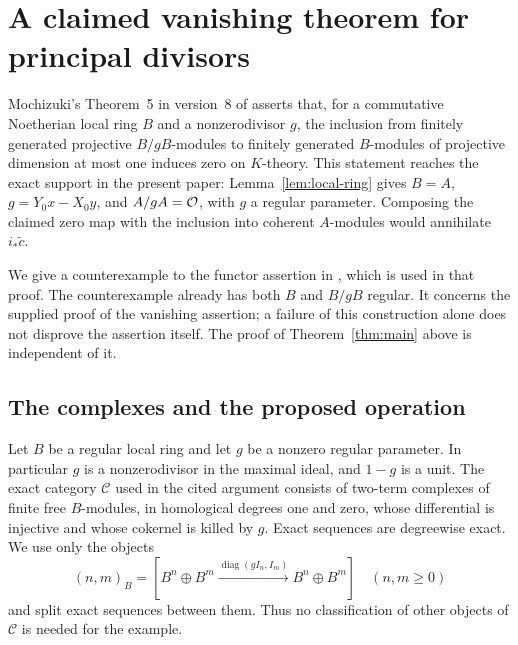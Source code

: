 \section{A claimed vanishing theorem for principal divisors}
\label{app:claimed-vanishing}

Mochizuki's Theorem~5 in version~8 of
\cite{Mochizuki2020} asserts that, for a commutative Noetherian local
ring $B$ and a nonzerodivisor $g$, the inclusion from finitely generated
projective $B/gB$-modules to finitely generated $B$-modules of projective
dimension at most one induces zero on $K$-theory. This statement reaches
the exact support in the present paper: Lemma~\ref{lem:local-ring} gives
$B=A$, $g=Y_0x-X_0y$, and $A/gA=\mathcal O$, with $g$ a regular parameter.
Composing the claimed zero map with the inclusion into coherent
$A$-modules would annihilate $i_*\widetilde c$.

We give a counterexample to the functor assertion in
\cite[Lemma~13(III)]{Mochizuki2020}, which is used in that proof.
The counterexample already has both $B$ and $B/gB$ regular. It concerns
the supplied proof of the vanishing assertion; a failure of this
construction alone does not disprove the assertion itself. The proof
of Theorem~\ref{thm:main} above is independent of it.

\subsection*{The complexes and the proposed operation}

Let $B$ be a regular local ring and let $g$ be a nonzero regular
parameter. In particular $g$ is a nonzerodivisor in the maximal ideal,
and $1-g$ is a unit. The exact category $\mathcal C$ used in the cited
argument consists of two-term complexes of finite free $B$-modules,
in homological degrees one and zero, whose differential is injective
and whose cokernel is killed by $g$. Exact sequences are degreewise
exact. We use only the objects
\[
 (n,m)_B=
 \left[B^n\oplus B^m
 \xrightarrow{\operatorname{diag}(gI_n,I_m)}B^n\oplus B^m\right]
 \quad(n,m\geq0)
\]
and split exact sequences between them. Thus no classification of
other objects of $\mathcal C$ is needed for the example.

